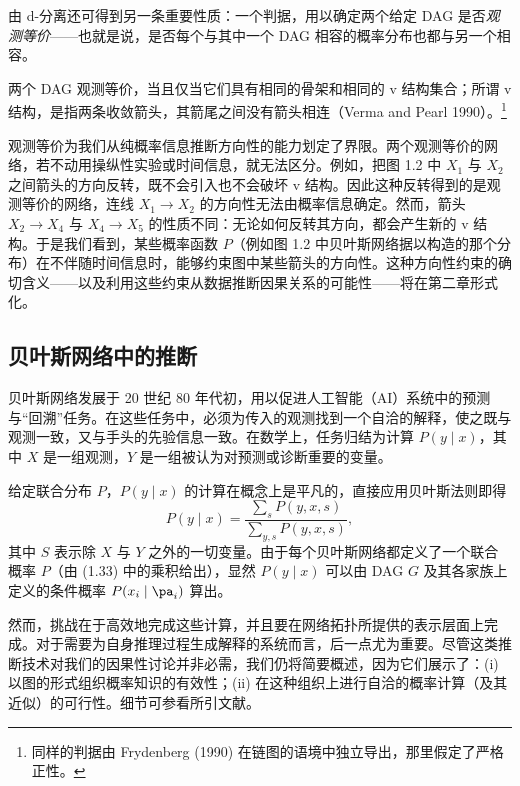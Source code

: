 由 d-分离还可得到另一条重要性质：一个判据，用以确定两个给定 DAG 是否\emph{观测等价}——也就是说，是否每个与其中一个 DAG 相容的概率分布也都与另一个相容。

\begin{theorem}[观测等价]
两个 DAG 观测等价，当且仅当它们具有相同的骨架和相同的 v 结构集合；所谓 v 结构，是指两条收敛箭头，其箭尾之间没有箭头相连（Verma and Pearl 1990）。\footnote{同样的判据由 Frydenberg (1990) 在链图的语境中独立导出，那里假定了严格正性。}
\end{theorem}

观测等价为我们从纯概率信息推断方向性的能力划定了界限。两个观测等价的网络，若不动用操纵性实验或时间信息，就无法区分。例如，把图 1.2 中 $X_1$ 与 $X_2$ 之间箭头的方向反转，既不会引入也不会破坏 v 结构。因此这种反转得到的是观测等价的网络，连线 $X_1\to X_2$ 的方向性无法由概率信息确定。然而，箭头 $X_2\to X_4$ 与 $X_4\to X_5$ 的性质不同：无论如何反转其方向，都会产生新的 v 结构。于是我们看到，某些概率函数 $P$（例如图 1.2 中贝叶斯网络据以构造的那个分布）在不伴随时间信息时，能够约束图中某些箭头的方向性。这种方向性约束的确切含义——以及利用这些约束从数据推断因果关系的可能性——将在第二章形式化。

\subsection{贝叶斯网络中的推断}

贝叶斯网络发展于 20 世纪 80 年代初，用以促进人工智能（AI）系统中的预测与“回溯”任务。在这些任务中，必须为传入的观测找到一个自洽的解释，使之既与观测一致，又与手头的先验信息一致。在数学上，任务归结为计算 $P(y\mid x)$，其中 $X$ 是一组观测，$Y$ 是一组被认为对预测或诊断重要的变量。

给定联合分布 $P$，$P(y\mid x)$ 的计算在概念上是平凡的，直接应用贝叶斯法则即得
\begin{equation}
P(y\mid x) = \frac{\sum_{s} P(y,x,s)}{\sum_{y,s} P(y,x,s)}, \tag{1.35}
\end{equation}
其中 $S$ 表示除 $X$ 与 $Y$ 之外的一切变量。由于每个贝叶斯网络都定义了一个联合概率 $P$（由 \textup{(1.33)} 中的乘积给出），显然 $P(y\mid x)$ 可以由 DAG $G$ 及其各家族上定义的条件概率 $P(x_i\mid\pa_i)$ 算出。

然而，挑战在于高效地完成这些计算，并且要在网络拓扑所提供的表示层面上完成。对于需要为自身推理过程生成解释的系统而言，后一点尤为重要。尽管这类推断技术对我们的因果性讨论并非必需，我们仍将简要概述，因为它们展示了：(i) 以图的形式组织概率知识的有效性；(ii) 在这种组织上进行自洽的概率计算（及其近似）的可行性。细节可参看所引文献。

